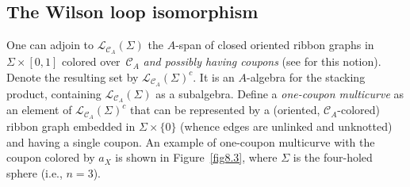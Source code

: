 \documentclass[pdftex]{sigma}%
\numberwithin{equation}{section}
\numberwithin{figure}{section}
\begin{document}
\subsection{The Wilson loop isomorphism}\label{Wiso} One can adjoin to $\mathcal{L}_{\mathcal{C}_{A}}(\Sigma)$ the $A$-span of closed oriented ribbon graphs in $\Sigma \times [0,1]$ colored over~$\mathcal{C}_{A}$ {\it and possibly having coupons} (see \cite{Tu} for this notion). Denote the resulting set by $\mathcal{L}_{\mathcal{C}_{A}}(\Sigma)^c$. It is an $A$-algebra for the stacking product, containing $\mathcal{L}_{\mathcal{C}_{A}}(\Sigma)$ as a subalgebra. Define a {\it one-coupon multicurve} as an element of $\mathcal{L}_{\mathcal{C}_{A}}(\Sigma)^c$ that can be represented by a (oriented, $\mathcal{C}_A$-colored) ribbon graph embedded in $\Sigma\times \{0\}$ (whence edges are unlinked and unknotted) and having a single coupon. An example of one-coupon multicurve with the coupon colored by $a_X$ is shown in Figure~\ref{fig8.3}, where $\Sigma$ is the four-holed sphere (i.e., $n=3$).
\end{document}
